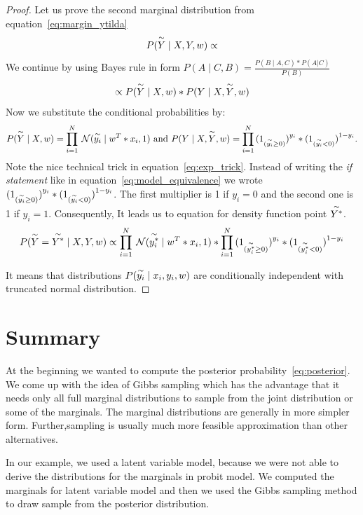\begin{proof}
Let us prove the second marginal distribution from equation~\ref{eq:margin_ytilda} 
\begin{equation}
P(\overset{\sim}{Y} \mid X, Y, w) \propto
\end{equation}
We continue by using Bayes rule in form $ P(A \mid C, B) = \frac{P( B \mid A, C) * P(A|C)}{P(B)}$ 
\begin{equation}
    \propto P(\overset{\sim}{Y} \mid X, w) * P(Y \mid X,\overset{\sim}{Y}, w)
\end{equation}
Now we substitute the conditional probabilities by: 
\begin{equation}\label{eq:exp_trick}
    P(\overset{\sim}{Y} \mid X, w) = \prod_{i=1}^{N}\:\mathcal{N}(\overset{\sim}{y_i} \mid w^T*x_i, 1) \text{ and } 
    P(Y \mid X,\overset{\sim}{Y}, w) = \prod_{i=1}^{N}{(1_{(\overset{\sim}{y_i} \ge 0)})}^{y_i} * {(1_{(\overset{\sim}{y_i} < 0)})}^{1-y_i}.
\end{equation}
Note the nice technical trick in equation~\ref{eq:exp_trick}. Instead of writing the {\it if statement} like in equation~\ref{eq:model_equivalence} we wrote ${(1_{(\overset{\sim}{y_i} \ge 0)})}^{y_i} * {(1_{(\overset{\sim}{y_i} < 0)})}^{1-y_i}$. The first multiplier is 1 if $y_i =0 $ and the second one is 1 if $y_i=1$. Consequently, It leads us to equation for density function point $\overset{\sim}{Y^*}$.
\begin{equation}
P(\overset{\sim}{Y} = \overset{\sim}{Y^*} \mid X, Y, w)
    \propto \prod_{i=1}^{N}\:\mathcal{N}(\overset{\sim}{y_i^*} \mid w^T*x_i, 1) * 
    \prod_{i=1}^{N}{(1_{(\overset{\sim}{y_i^*} \ge 0)})}^{y_i} * {(1_{(\overset{\sim}{y_i^*} < 0)})}^{1-y_i}
\end{equation}

It means that distributions $ P(\overset{\sim}{y_i} \mid  x_i, y_i, w) $ are conditionally independent with truncated normal distribution.
\end{proof}


\section{Summary} 
\label{sec:summary}
At the beginning we wanted to compute the posterior probability~\ref{eq:posterior}. We come up with the idea of Gibbs sampling which has the advantage that it needs only all full marginal distributions to sample from the joint distribution or some of the marginals. The marginal distributions are generally in more simpler form. Further,sampling is usually much more feasible approximation than other alternatives. 

In our example, we used a latent variable model, because we were not able to derive the distributions for the marginals in probit model. We computed the marginals for latent variable model and then we used the Gibbs sampling method to draw sample from the posterior distribution.

